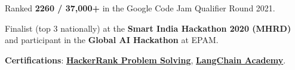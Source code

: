 \begin{zitemize}
    \item Ranked \textbf{2260 / 37,000+} in the Google Code Jam Qualifier Round 2021.
    \item Finalist (top 3 nationally) at the \textbf{Smart India Hackathon 2020 (MHRD)} and participant in the \textbf{Global AI Hackathon} at EPAM.
    \item \textbf{Certifications}: \href{https://www.hackerrank.com/certificates/7e492a2e11be}{\textbf{HackerRank Problem Solving}}, \href{https://academy.langchain.com/certificates/vkkkoij3ke}{\textbf{LangChain Academy}}.
\end{zitemize}
